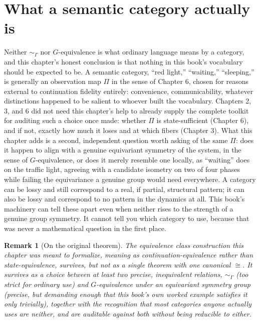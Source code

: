 \documentclass[11pt]{report}
\newtheorem{remark}{Remark}[chapter]
\begin{document}
\section*{What a semantic category actually is}

Neither $\sim_\Gamma$ nor $G$-equivalence is what ordinary
language means by a category, and this chapter's honest conclusion is
that nothing in this book's vocabulary should be expected to be. A
semantic category, ``red light,'' ``waiting,'' ``sleeping,'' is
generally an observation map $\Pi$ in the sense of Chapter 6, chosen
for reasons external to continuation fidelity entirely: convenience,
communicability, whatever distinctions happened to be salient to
whoever built the vocabulary. Chapters 2, 3, and 6 did not need this
chapter's help to already supply the complete toolkit for auditing
such a choice once made: whether $\Pi$ is state-sufficient
(Chapter 6), and if not, exactly how much it loses and at which fibers
(Chapter 3). What this chapter adds is a second, independent question
worth asking of the same $\Pi$: does it happen to align with a genuine
equivariant symmetry of the system, in the sense of $G$-equivalence,
or does it merely resemble one locally, as ``waiting'' does on the
traffic light, agreeing with a candidate isometry on two of four
phases while failing the equivariance a genuine group would need
everywhere. A category can be lossy and still correspond to a real,
if partial, structural pattern; it can also be lossy and correspond
to no pattern in the dynamics at all. This book's machinery can tell
these apart even when neither rises to the strength of a genuine
group symmetry. It cannot tell you which category to use, because
that was never a mathematical question in the first place.

\begin{remark}[On the original theorem]
The equivalence class construction this chapter was meant to
formalize, meaning as continuation-equivalence rather than
state-equivalence, survives, but not as a single theorem with one
canonical $\cong$. It survives as a choice between at least two
precise, inequivalent relations, $\sim_\Gamma$ (too strict for
ordinary use) and $G$-equivalence under an equivariant symmetry group
(precise, but demanding enough that this book's own worked example
satisfies it only trivially), together with the recognition that most
categories anyone actually uses are neither, and are auditable against
both without being reducible to either.
\end{remark}
\end{document}
